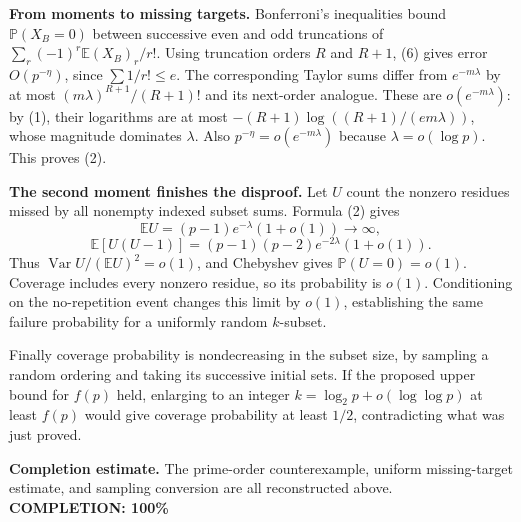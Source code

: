 \textbf{From moments to missing targets.}
Bonferroni's inequalities bound $\mathbb P(X_B=0)$ between successive even and odd truncations of
$\sum_r(-1)^r\mathbb E(X_B)_r/r!$. Using truncation orders $R$ and $R+1$, (6) gives error $O(p^{-\eta})$, since $\sum1/r!\leq e$.
The corresponding Taylor sums differ from $e^{-m\lambda}$ by at most
$(m\lambda)^{R+1}/(R+1)!$ and its next-order analogue. These are $o(e^{-m\lambda})$: by (1), their logarithms are at most
$-(R+1)\log((R+1)/(em\lambda))$, whose magnitude dominates $\lambda$. Also $p^{-\eta}=o(e^{-m\lambda})$ because $\lambda=o(\log p)$. This proves (2).

\textbf{The second moment finishes the disproof.}
Let $U$ count the nonzero residues missed by all nonempty indexed subset sums. Formula (2) gives
\[
 \mathbb EU=(p-1)e^{-\lambda}(1+o(1))\longrightarrow\infty,
\]
\[
 \mathbb E[U(U-1)]=(p-1)(p-2)e^{-2\lambda}(1+o(1)).
\]
Thus $\operatorname{Var}U/(\mathbb EU)^2=o(1)$, and Chebyshev gives $\mathbb P(U=0)=o(1)$. Coverage includes every nonzero residue, so its probability is $o(1)$.
Conditioning on the no-repetition event changes this limit by $o(1)$, establishing the same failure probability for a uniformly random $k$-subset.

Finally coverage probability is nondecreasing in the subset size, by sampling a random ordering and taking its successive initial sets. If the proposed upper bound for $f(p)$ held, enlarging to an integer $k=\log_2p+o(\log\log p)$ at least $f(p)$ would give coverage probability at least $1/2$, contradicting what was just proved.

\textbf{Completion estimate.}
The prime-order counterexample, uniform missing-target estimate, and sampling conversion are all reconstructed above.
\textbf{COMPLETION: 100\%}
